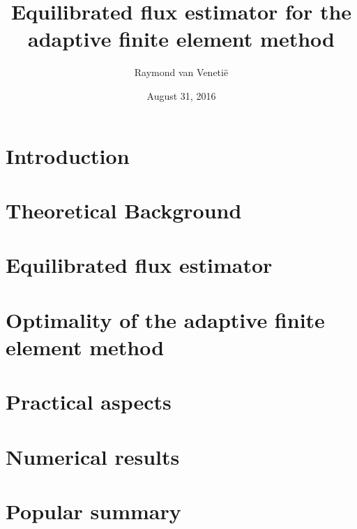 \documentclass{uvamath}
\title{Equilibrated flux estimator for the adaptive finite element method} %
\author[raymond.van.venetie@gmail.com, 10004627]{Raymond van Veneti\"e} %
\date{August 31, 2016} %
\theoremstyle{plain}%
\theoremstyle{definition}
\theoremstyle{remark}
\newcommand{\1}{\mathds{1}}
\begin{document}
\maketitle
\begin{abstract}
  
\end{abstract}

\setcounter{tocdepth}{1}
\tableofcontents

\chapter*{Introduction}


\chapter{Theoretical Background}


\chapter{Equilibrated flux estimator}


\chapter{Optimality of the adaptive finite element method}


\chapter{Practical aspects}


\chapter{Numerical results}


%

\chapter*{Popular summary}

\end{document}
